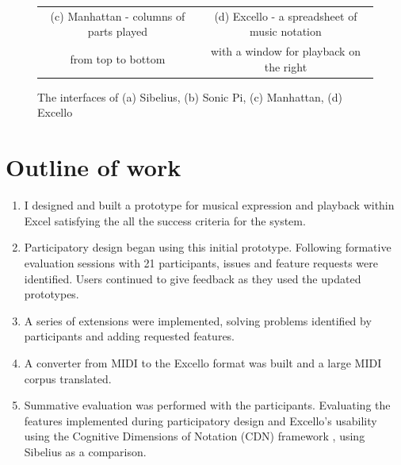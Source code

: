 \begin{figure}[ht]
\begin{tabular}{cc}
  (c) Manhattan - columns of parts played&(d) Excello - a spreadsheet of music notation\\
  from top to bottom&with a window for playback on the right\\
\end{tabular}
\caption{The interfaces of (a) Sibelius, (b) Sonic Pi, (c) Manhattan, (d) Excello}
\label{intro:interfaces}
\end{figure}

\vspace{-10pt}

\section{Outline of work}

\begin{enumerate}

\item I designed and built a prototype for musical expression and playback within Excel satisfying the all the success criteria for the system.

\item Participatory design began using this initial prototype. Following formative evaluation sessions with 21 participants, issues and feature requests were identified. Users continued to give feedback as they used the updated prototypes.

\item A series of extensions were implemented, solving problems identified by participants and adding requested features.

\item A converter from MIDI to the Excello format was built and a large MIDI corpus translated.

\item Summative evaluation was performed with the participants. Evaluating the features implemented during participatory design and Excello's usability using the Cognitive Dimensions of Notation (CDN) framework \cite{blackwell:tutorial}, using Sibelius as a comparison.

\end{enumerate}
